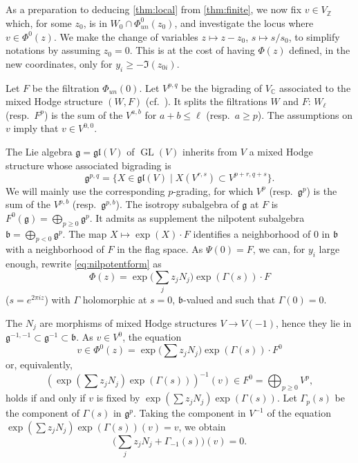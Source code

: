 \documentclass[11pt,a4paper]{article}
\theoremstyle{plain}
\theoremstyle{definition}
\DeclareMathOperator{\GL}{GL}
\begin{document}
\subsection{}
As a preparation to deducing \ref{thm:local} from \ref{thm:finite}, we now fix $v\in V_{\mathbb{Z}}$ which, for some $z_0$, is in $W_0\cap\Phi_{un}^0(z_0)$, and investigate the locus where $v\in\Phi^0(z)$. We make the change of variables $z\mapsto z-z_0$, $s\mapsto s/s_0$, to simplify notations by assuming $z_0=0$. This is at the cost of having $\Phi(z)$ defined, in the new coordinates, only for $y_i\geq -\Im(z_{0i})$.

Let $F$ be the filtration $\Phi_{un}(0)$. Let $V^{p,q}$ be the bigrading of $V_{\mathbb{C}}$ associated to the mixed Hodge structure $(W,F)$ (cf.\ \cite[2.13]{deligne-trdc2}). It splits the filtrations $W$ and $F$: $W_{\ell}$ (resp.\ $F^p$) is the sum of the $V^{a,b}$ for $a+b\leq\ell$ (resp.\ $a\geq p$). The assumptions on $v$ imply that $v\in V^{0,0}$.

The Lie algebra $\mathfrak{g}=\mathfrak{gl}(V)$ of $\GL(V)$ inherits from $V$ a mixed Hodge structure whose associated bigrading is
\[
\mathfrak{g}^{p,q}=\{X\in\mathfrak{gl}(V)\mid X(V^{r,s})\subset V^{p+r,q+s}\}.
\]
We will mainly use the corresponding $p$-grading, for which $V^p$ (resp.\ $\mathfrak{g}^p$) is the sum of the $V^{p,b}$ (resp.\ $\mathfrak{g}^{p,b}$). The isotropy subalgebra of $\mathfrak{g}$ at $F$ is $F^0(\mathfrak{g})=\bigoplus_{p\geq 0}\mathfrak{g}^p$. It admits as supplement the nilpotent subalgebra $\mathfrak{b}=\bigoplus_{p<0}\mathfrak{g}^p$. The map $X\mapsto \exp(X)\cdot F$ identifies a neighborhood of $0$ in $\mathfrak{b}$ with a neighborhood of $F$ in the flag space. As $\Psi(0)=F$, we can, for $y_i$ large enough, rewrite \eqref{eq:nilpotentform} as
\begin{equation}\label{eq:phigamma}
\Phi(z)=\exp\bigl(\sum_j z_j N_j\bigr)\exp(\Gamma(s))\cdot F
\end{equation}
($s=e^{2\pi iz}$) with $\Gamma$ holomorphic at $s=0$, $\mathfrak{b}$-valued and such that $\Gamma(0)=0$.

The $N_j$ are morphisms of mixed Hodge structures $V\to V(-1)$, hence they lie in $\mathfrak{g}^{-1,-1}\subset\mathfrak{g}^{-1}\subset\mathfrak{b}$. As $v\in V^0$, the equation
\begin{equation}\label{eq:vinF0}
v\in\Phi^0(z)=\exp\bigl(\sum z_j N_j\bigr)\exp(\Gamma(s))\cdot F^0
\end{equation}
or, equivalently,
\[
(\exp(\sum z_j N_j)\exp(\Gamma(s)))^{-1}(v)\in F^0=\bigoplus_{p\geq 0}V^p,
\]
holds if and only if $v$ is fixed by $\exp(\sum z_j N_j)\exp(\Gamma(s))$. Let $\Gamma_p(s)$ be the component of $\Gamma(s)$ in $\mathfrak{g}^p$. Taking the component in $V^{-1}$ of the equation $\exp(\sum z_j N_j)\exp(\Gamma(s))(v)=v$, we obtain
\begin{equation}\label{eq:component}
\bigl(\sum_j z_j N_j+\Gamma_{-1}(s)\bigr)(v)=0.
\end{equation}
\end{document}
